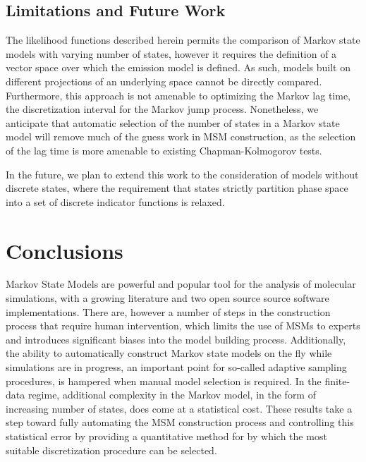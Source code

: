 \documentclass[twocolumn,floatfix,nofootinbib,aps]{revtex4-1}
\begin{document}
\subsection{Limitations and Future Work}

The likelihood functions described herein permits the comparison of Markov state models with varying number of states, however it requires the definition of a vector space over which the emission model is defined. As such, models built on different projections of an underlying space cannot be directly compared. Furthermore, this approach is not amenable to optimizing the Markov lag time, the discretization interval for the Markov jump process. Nonetheless, we anticipate that automatic selection of the number of states in a Markov state model will remove much of the guess work in MSM construction, as the selection of the lag time is more amenable to existing Chapman-Kolmogorov tests.

In the future, we plan to extend this work to the consideration of models without discrete states, where the requirement that states strictly partition phase space into a set of discrete indicator functions is relaxed.

\section{Conclusions}

Markov State Models are powerful and popular tool for the analysis of molecular simulations, with a growing literature and two open source source software implementations\cite{Beauchamp2011Msmbuilder2, Senne2012EMMA}. There are, however a number of steps in the construction process that require human intervention, which limits the use of MSMs to experts and introduces significant biases into the model building process. Additionally, the ability to automatically construct Markov state models on the fly while simulations are in progress, an important point for so-called adaptive sampling procedures\cite{Bowman2010Enhanced}, is hampered when manual model selection is required. In the finite-data regime, additional complexity in the Markov model, in the form of increasing number of states, does come at a statistical cost.
These results take a step toward fully automating the MSM construction process and controlling this statistical error by providing a quantitative method for by which the most suitable discretization procedure can be selected.


\end{document}

